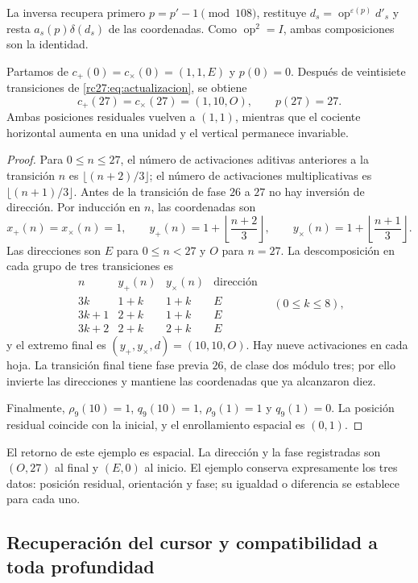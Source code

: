 La inversa recupera primero $p=p'-1\pmod{108}$, restituye
$d_s=\operatorname{op}^{\varepsilon(p)}d'_s$ y resta
$a_s(p)\delta(d_s)$ de las coordenadas. Como
$\operatorname{op}^2=I$, ambas composiciones son la identidad.

\begin{theorem}
\label{rc27:thm:ejemplo}
Partamos de
$c_+(0)=c_\times(0)=(1,1,E)$ y $p(0)=0$.
Después de veintisiete transiciones de
\eqref{rc27:eq:actualizacion}, se obtiene
\[
c_+(27)=c_\times(27)=(1,10,O),\qquad p(27)=27.
\]
Ambas posiciones residuales vuelven a $(1,1)$, mientras que el
cociente horizontal aumenta en una unidad y el vertical permanece
invariable.
\end{theorem}
\begin{proof}
Para $0\le n\le27$, el número de activaciones aditivas anteriores
a la transición $n$ es $\lfloor(n+2)/3\rfloor$; el número de
activaciones multiplicativas es $\lfloor(n+1)/3\rfloor$. Antes
de la transición de fase $26$ a $27$ no hay inversión de dirección.
Por inducción en $n$, las coordenadas son
\[
x_+(n)=x_\times(n)=1,\qquad
y_+(n)=1+\left\lfloor\frac{n+2}{3}\right\rfloor,\qquad
y_\times(n)=1+\left\lfloor\frac{n+1}{3}\right\rfloor.
\]
Las direcciones son $E$ para $0\le n<27$ y $O$ para $n=27$.
La descomposición en cada grupo de tres transiciones es
\[
\begin{array}{c|c|c|c}
n&y_+(n)&y_\times(n)&\text{dirección}\\\hline
3k&1+k&1+k&E\\
3k+1&2+k&1+k&E\\
3k+2&2+k&2+k&E
\end{array}
\quad(0\le k\le8),
\]
y el extremo final es $(y_+,y_\times,d)=(10,10,O)$.
Hay nueve activaciones en cada hoja. La transición final tiene fase
previa $26$, de clase dos módulo tres; por ello invierte las
direcciones y mantiene las coordenadas que ya alcanzaron diez.

Finalmente, $\rho_9(10)=1$, $q_9(10)=1$,
$\rho_9(1)=1$ y $q_9(1)=0$. La posición residual coincide con
la inicial, y el enrollamiento espacial es $(0,1)$.
\end{proof}

El retorno de este ejemplo es espacial. La dirección y la fase
registradas son $(O,27)$ al final y $(E,0)$ al inicio. El ejemplo
conserva expresamente los tres datos: posición residual, orientación y
fase; su igualdad o diferencia se establece para cada uno.

\subsection{Recuperación del cursor y compatibilidad a toda profundidad}

